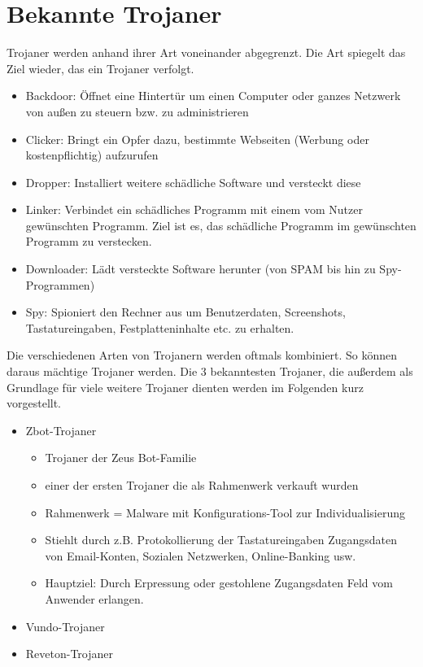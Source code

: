 \section{Bekannte Trojaner}\label{sec:bekannteTrojaner}
Trojaner werden anhand ihrer Art voneinander abgegrenzt. Die Art spiegelt das Ziel wieder, das ein Trojaner verfolgt. 
\begin{itemize}
    \item Backdoor: Öffnet eine Hintertür um einen Computer oder ganzes Netzwerk von außen zu steuern bzw. zu administrieren
    \item Clicker: Bringt ein Opfer dazu, bestimmte Webseiten (Werbung oder kostenpflichtig) aufzurufen 
    \item Dropper: Installiert weitere schädliche Software und versteckt diese
    \item Linker: Verbindet ein schädliches Programm mit einem vom Nutzer gewünschten Programm. Ziel ist es, das schädliche Programm im gewünschten Programm zu verstecken.
    \item Downloader: Lädt versteckte Software herunter (von SPAM bis hin zu Spy-Programmen)
    \item Spy: Spioniert den Rechner aus um Benutzerdaten, Screenshots, Tastatureingaben, Festplatteninhalte etc. zu erhalten.
\end{itemize}
Die verschiedenen Arten von Trojanern werden oftmals kombiniert. So können daraus mächtige Trojaner werden. 
Die 3 bekanntesten Trojaner, die außerdem als Grundlage für viele weitere Trojaner dienten werden im Folgenden kurz vorgestellt. 
\begin{itemize}
    \item Zbot-Trojaner 
    \begin{itemize}
        \item Trojaner der Zeus Bot-Familie
        \item einer der ersten Trojaner die als Rahmenwerk verkauft wurden
        \item Rahmenwerk = Malware mit Konfigurations-Tool zur Individualisierung
        \item Stiehlt durch z.B. Protokollierung der Tastatureingaben Zugangsdaten von Email-Konten, Sozialen Netzwerken, Online-Banking usw.
        \item Hauptziel: Durch Erpressung oder gestohlene Zugangsdaten Feld vom Anwender erlangen.
    \end{itemize}
    \item Vundo-Trojaner
    \item Reveton-Trojaner
\end{itemize}